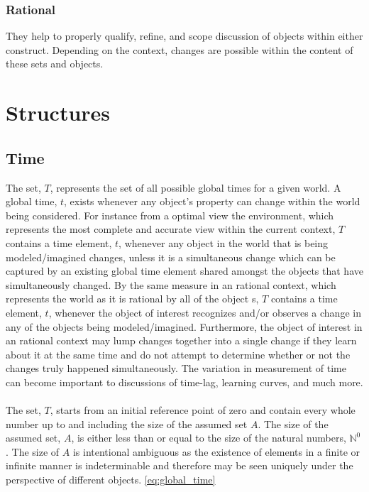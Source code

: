 \documentclass[]{article}
\begin{document}
\subsubsection*{Rational}
They help to properly qualify, refine, and scope discussion of objects within either construct. Depending on the context, changes are possible within the content of these sets and objects.


\section*{Structures}
\subsection*{Time}
The set, $T$, represents the set of all possible global times for a given world. A global time, $t$, exists whenever any object's property can change within the world being considered. For instance from a optimal view the environment, which represents the most complete and accurate view within the current context, $T$ contains a time element, $t$, whenever any object in the world that is being modeled/imagined changes, unless it is a simultaneous change which can be captured by an existing global time element shared amongst the objects that have simultaneously changed. By the same measure in an rational context, which represents the world as it is rational by all of the object s, $T$ contains a time element, $t$, whenever the object of interest recognizes and/or observes a change in any of the objects being modeled/imagined. Furthermore, the object of interest in an rational context may lump changes together into a single change if they learn about it at the same time and do not attempt to determine whether or not the changes truly happened simultaneously. The variation in measurement of time can become important to discussions of time-lag, learning curves, and much more. 
\\
\\
The set, $T$, starts from an initial reference point of zero and contain every whole number up to and including the size of the assumed set $A$. The size of the assumed set, $A$, is either less than or equal to the size of the natural numbers, $\mathbb{N}^{0}$. The size of $A$ is intentional ambiguous as the existence of elements in a finite or infinite manner is indeterminable and therefore may be seen uniquely under the perspective of different objects. \eqref{eq:global_time}
\end{document}

